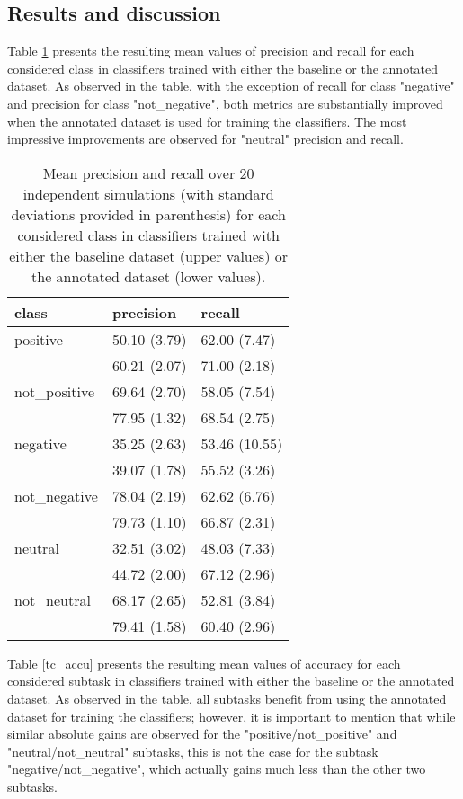 \subsection{Results and discussion}
Table \ref{tc_pre_rec} presents the resulting mean values of precision and recall for each considered class 
in classifiers trained with either the baseline or the annotated dataset. As observed in the table, with the
exception of recall for class "negative" and precision for class "not_negative", both metrics are substantially 
improved when the annotated dataset is used for training the classifiers. The most impressive improvements
are observed for "neutral" precision and recall. 

\begin{table}
\begin{tabular}{|l|l|l|}
\hline
class &precision &recall \\ 
\hline
positive &50.10 (3.79) &62.00 (7.47) \\
&60.21 (2.07)  &71.00 (2.18) \\ 
\hline
not_positive &69.64 (2.70) &58.05 (7.54) \\ 
&77.95 (1.32) &68.54 (2.75) \\ 
\hline
negative &35.25 (2.63) &53.46 (10.55) \\ 
&39.07 (1.78) &55.52 (3.26) \\ 
\hline
not_negative &78.04 (2.19) &62.62 (6.76) \\ 
&79.73 (1.10) &66.87 (2.31) \\ 
\hline
neutral &32.51 (3.02) &48.03 (7.33) \\ 
&44.72 (2.00) &67.12 (2.96) \\ 
\hline
not_neutral &68.17 (2.65) &52.81 (3.84) \\ 
&79.41 (1.58) &60.40 (2.96) \\ 
\hline
\end{tabular}
\caption{Mean precision and recall over 20 independent simulations (with standard deviations provided in parenthesis) 
for each considered class in classifiers trained with either the baseline dataset (upper values) or the annotated dataset (lower values).}
\label{tc_pre_rec}
\end{table}

Table \ref{tc_accu} presents the resulting mean values of accuracy for each considered subtask 
in classifiers trained with either the baseline or the annotated dataset. As observed in the table,
all subtasks benefit from using the annotated dataset for training the classifiers; however, it is 
important to mention that while similar absolute gains are observed for the "positive/not_positive" 
and "neutral/not_neutral" subtasks, this is not the case for the subtask "negative/not_negative", 
which actually gains much less than the other two subtasks.

